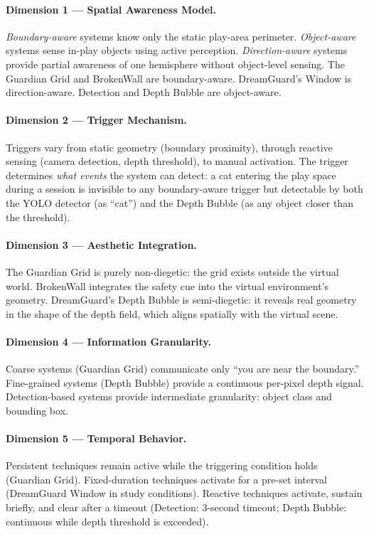 \documentclass{styling/vgtc} %
\begin{document}
\paragraph{Dimension 1 — Spatial Awareness Model.}
\textit{Boundary-aware} systems know only the static play-area perimeter.
\textit{Object-aware} systems sense in-play objects using active perception.
\textit{Direction-aware} systems provide partial awareness of one
hemisphere without object-level sensing. The Guardian Grid and
BrokenWall are boundary-aware. DreamGuard's Window is direction-aware.
Detection and Depth Bubble are object-aware.

\paragraph{Dimension 2 — Trigger Mechanism.}
Triggers vary from static geometry (boundary proximity), through reactive
sensing (camera detection, depth threshold), to manual activation.
The trigger determines \emph{what events} the system can detect: a cat
entering the play space during a session is invisible to any
boundary-aware trigger but detectable by both the YOLO detector (as
``cat'') and the Depth Bubble (as any object closer than the threshold).

\paragraph{Dimension 3 — Aesthetic Integration.}
The Guardian Grid is purely non-diegetic: the grid exists outside the
virtual world. BrokenWall integrates the safety cue into the virtual
environment's geometry. DreamGuard's Depth Bubble is semi-diegetic: it
reveals real geometry in the shape of the depth field, which aligns
spatially with the virtual scene.

\paragraph{Dimension 4 — Information Granularity.}
Coarse systems (Guardian Grid) communicate only ``you are near the
boundary.'' Fine-grained systems (Depth Bubble) provide a
continuous per-pixel depth signal. Detection-based systems provide
intermediate granularity: object class and bounding box.

\paragraph{Dimension 5 — Temporal Behavior.}
Persistent techniques remain active while the triggering condition
holds (Guardian Grid). Fixed-duration techniques activate for a
pre-set interval (DreamGuard Window in study conditions). Reactive
techniques activate, sustain briefly, and clear after a timeout
(Detection: 3-second timeout; Depth Bubble: continuous while depth
threshold is exceeded).
\end{document}
